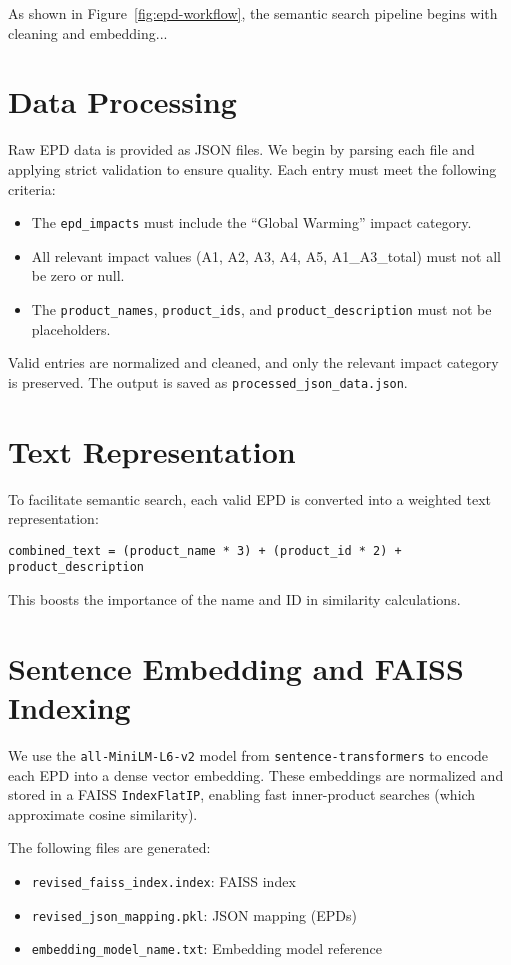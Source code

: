 \documentclass[11pt]{article}
\begin{document}
As shown in Figure~\ref{fig:epd-workflow}, the semantic search pipeline begins with cleaning and embedding...


\section{Data Processing}
Raw EPD data is provided as JSON files. We begin by parsing each file and applying strict validation to ensure quality. Each entry must meet the following criteria:

\begin{itemize}
    \item The \texttt{epd\_impacts} must include the ``Global Warming'' impact category.
    \item All relevant impact values (A1, A2, A3, A4, A5, A1\_A3\_total) must not all be zero or null.
    \item The \texttt{product\_names}, \texttt{product\_ids}, and \texttt{product\_description} must not be placeholders.
\end{itemize}

Valid entries are normalized and cleaned, and only the relevant impact category is preserved. The output is saved as \texttt{processed\_json\_data.json}.

\section{Text Representation}
To facilitate semantic search, each valid EPD is converted into a weighted text representation:

\begin{lstlisting}
combined_text = (product_name * 3) + (product_id * 2) + product_description
\end{lstlisting}

This boosts the importance of the name and ID in similarity calculations.

\section{Sentence Embedding and FAISS Indexing}
We use the \texttt{all-MiniLM-L6-v2} model from \texttt{sentence-transformers} to encode each EPD into a dense vector embedding. These embeddings are normalized and stored in a FAISS \texttt{IndexFlatIP}, enabling fast inner-product searches (which approximate cosine similarity).

The following files are generated:
\begin{itemize}
    \item \texttt{revised\_faiss\_index.index}: FAISS index
    \item \texttt{revised\_json\_mapping.pkl}: JSON mapping (EPDs)
    \item \texttt{embedding\_model\_name.txt}: Embedding model reference
\end{itemize}
\end{document}
